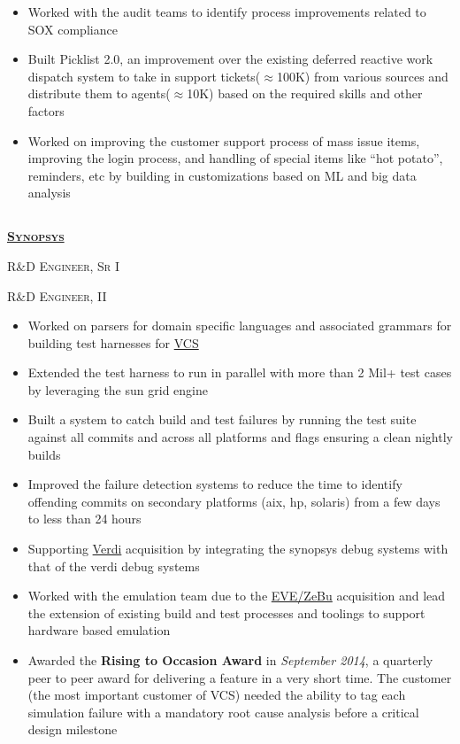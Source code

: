 \documentclass{article}
\begin{document}
\begin{itemize}[noitemsep,nolistsep]
\item Worked with the audit teams to identify process improvements related to SOX compliance
\item Built Picklist 2.0, an improvement over the existing deferred reactive work dispatch system to take in support tickets($\approx$100K) from various sources and distribute them to agents($\approx$10K) based on the required skills and other factors
\item Worked on improving the customer support process of mass issue items, improving the login process, and handling of special items like “hot potato”, reminders, etc by building in customizations based on ML and big data analysis
\end{itemize}

\subsection[Synopsys]{}

{\raggedright{\textsc{\textbf{\href{https://www.synopsys.com/}{Synopsys}}}}} \hfill {}

{\raggedright{\textsc{R\&D Engineer, Sr I}}} \hfill {}

{\raggedright{\textsc{R\&D Engineer, II}}} \hfill {}

\begin{itemize}[noitemsep,nolistsep]
\item Worked on parsers for domain specific languages and associated grammars for building test harnesses for \href{https://www.synopsys.com/verification/simulation/vcs.html}{VCS}
\item Extended the test harness to run in parallel with more than 2 Mil+ test cases by leveraging the sun grid engine
\item Built a system to catch build and test failures by running the test suite against all commits and across all platforms and flags ensuring a clean nightly builds
\item Improved the failure detection systems to reduce the time to identify offending commits on secondary platforms (aix, hp, solaris) from a few days to less than 24 hours
\item Supporting \href{https://www.synopsys.com/verification/debug/verdi.html}{Verdi} acquisition by integrating the synopsys debug systems with that of the verdi debug systems
\item Worked with the emulation team due to the \href{https://www.synopsys.com/verification/emulation.html}{EVE/ZeBu} acquisition and lead the extension of existing build and test processes and toolings to support hardware based emulation
\item Awarded the \textbf{Rising to Occasion Award} in \textit{September 2014}, a quarterly peer to peer award for delivering a feature in a very short time. The customer (the most important customer of VCS) needed the ability to tag each simulation failure with a mandatory root cause analysis before a critical design milestone
\end{itemize}
\end{document}
